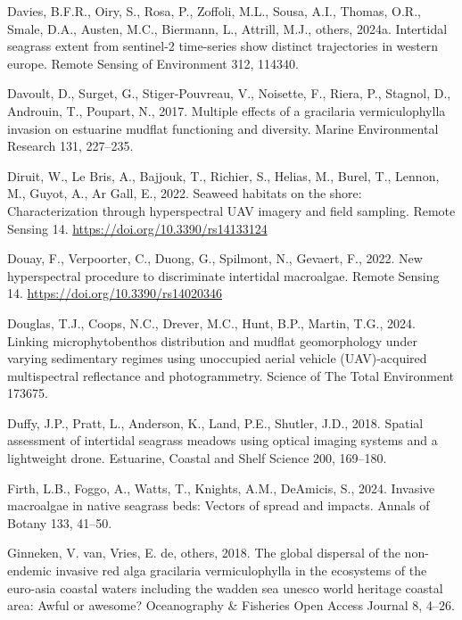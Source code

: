 \documentclass[
  letterpaper,
  DIV=11,
  numbers=noendperiod]{scrartcl}
\newlength{\cslhangindent}
\newenvironment{CSLReferences}[2] %
 {\begin{list}{}{%
  \setlength{\itemindent}{0pt}
  \setlength{\leftmargin}{0pt}
  \setlength{\parsep}{0pt}
  \ifodd #1
   \setlength{\leftmargin}{\cslhangindent}
   \setlength{\itemindent}{-1\cslhangindent}
  \fi
  \setlength{\itemsep}{#2\baselineskip}}}
 {\end{list}}
\begin{document}
\begin{CSLReferences}{1}{0}
Davies, B.F.R., Oiry, S., Rosa, P., Zoffoli, M.L., Sousa, A.I., Thomas,
O.R., Smale, D.A., Austen, M.C., Biermann, L., Attrill, M.J., others,
2024a. Intertidal seagrass extent from sentinel-2 time-series show
distinct trajectories in western europe. Remote Sensing of Environment
312, 114340.

Davoult, D., Surget, G., Stiger-Pouvreau, V., Noisette, F., Riera, P.,
Stagnol, D., Androuin, T., Poupart, N., 2017. Multiple effects of a
gracilaria vermiculophylla invasion on estuarine mudflat functioning and
diversity. Marine Environmental Research 131, 227--235.

Diruit, W., Le Bris, A., Bajjouk, T., Richier, S., Helias, M., Burel,
T., Lennon, M., Guyot, A., Ar Gall, E., 2022. Seaweed habitats on the
shore: Characterization through hyperspectral UAV imagery and field
sampling. Remote Sensing 14. \url{https://doi.org/10.3390/rs14133124}

Douay, F., Verpoorter, C., Duong, G., Spilmont, N., Gevaert, F., 2022.
New hyperspectral procedure to discriminate intertidal macroalgae.
Remote Sensing 14. \url{https://doi.org/10.3390/rs14020346}

Douglas, T.J., Coops, N.C., Drever, M.C., Hunt, B.P., Martin, T.G.,
2024. Linking microphytobenthos distribution and mudflat geomorphology
under varying sedimentary regimes using unoccupied aerial vehicle
(UAV)-acquired multispectral reflectance and photogrammetry. Science of
The Total Environment 173675.

Duffy, J.P., Pratt, L., Anderson, K., Land, P.E., Shutler, J.D., 2018.
Spatial assessment of intertidal seagrass meadows using optical imaging
systems and a lightweight drone. Estuarine, Coastal and Shelf Science
200, 169--180.

Firth, L.B., Foggo, A., Watts, T., Knights, A.M., DeAmicis, S., 2024.
Invasive macroalgae in native seagrass beds: Vectors of spread and
impacts. Annals of Botany 133, 41--50.

Ginneken, V. van, Vries, E. de, others, 2018. The global dispersal of
the non-endemic invasive red alga gracilaria vermiculophylla in the
ecosystems of the euro-asia coastal waters including the wadden sea
unesco world heritage coastal area: Awful or awesome? Oceanography \&
Fisheries Open Access Journal 8, 4--26.


\end{CSLReferences}
\end{document}

